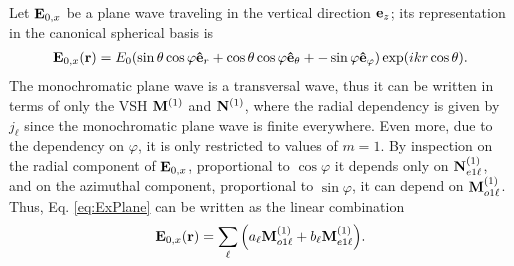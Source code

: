 
 Let $\vb{E}_{0,x}$ be a plane wave traveling in the vertical direction $\vb{e}_z$; its representation in the canonical spherical basis is
 \begin{align}
 \vb{E}_{0,x} (\vb{r})= E_0\qty(\sin\theta\cos\varphi \vu{e}_r +
					\cos\theta\cos\varphi \vu{e}_\theta +
					- \sin\varphi \vu{e}_\varphi) \exp(ikr\cos\theta).
	\label{eq:ExPlane}
 \end{align}
The monochromatic plane wave is a transversal wave, thus it can be written in terms of only the VSH $\vb{M}^{(1)}$ and $\vb{N}^{(1)}$, where the radial dependency is given by $j_\ell$ since the monochromatic plane wave is finite everywhere. Even more, due to the dependency on $\varphi$, it is only restricted to values of $m = 1$. By inspection on the radial component of $\vb{E}_{0,x}$, proportional to $\cos\varphi$ it depends only on $\vb{N}_{e1\ell}^{(1)}$, and on the azimuthal component, proportional to $\sin\varphi$, it can depend on $\vb{M}_{o1\ell}^{(1)}$. Thus, Eq. \eqref{eq:ExPlane} can be written as the linear combination
 \begin{align}
 \vb{E}_{0,x} (\vb{r})= \sum_\ell\qty(a_\ell \vb{M}_{o1\ell}^{(1)} + b_\ell \vb{M}_{e1\ell}^{(1)}).
	\label{eq:ExPlane}
 \end{align}




























































































